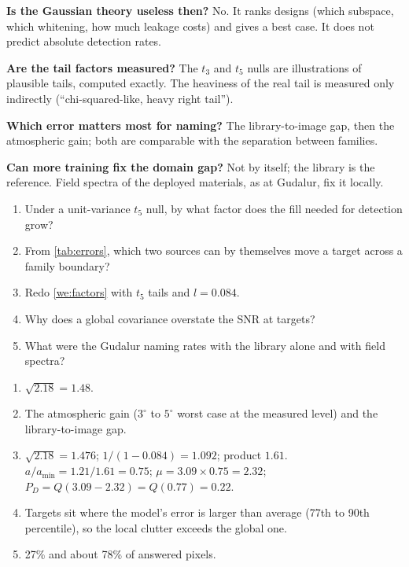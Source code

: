 \documentclass[11pt,a4paper,oneside,openany]{book}
\begin{document}
\begin{confusions}
\textbf{Is the Gaussian theory useless then?} No. It ranks designs (which subspace, which whitening, how much leakage costs) and gives a best case. It does not predict
absolute detection rates.

\textbf{Are the tail factors measured?} The $t_3$ and $t_5$ nulls are illustrations of plausible tails, computed exactly. The heaviness of the real tail is
measured only indirectly (``chi-squared-like, heavy right tail'').

\textbf{Which error matters most for naming?} The library-to-image gap, then the atmospheric gain; both are comparable with the separation between families.

\textbf{Can more training fix the domain gap?} Not by itself; the library is the reference. Field spectra of the deployed materials, as at Gudalur, fix it locally.
\end{confusions}

\begin{checkyourself}
\begin{enumerate}
\item Under a unit-variance $t_5$ null, by what factor does the fill needed for detection grow?
\item From \cref{tab:errors}, which two sources can by themselves move a target across a family boundary?
\item Redo \cref{we:factors} with $t_5$ tails and $l=0.084$.
\item Why does a global covariance overstate the SNR at targets?
\item What were the Gudalur naming rates with the library alone and with field spectra?
\end{enumerate}
\end{checkyourself}

\begin{answers}
\begin{enumerate}
\item $\sqrt{2.18}=1.48$.
\item The atmospheric gain ($3^\circ$ to $5^\circ$ worst case at the measured level) and the library-to-image gap.
\item $\sqrt{2.18}=1.476$; $1/(1-0.084)=1.092$; product $1.61$. $a/a_{\min}=1.21/1.61=0.75$; $\mu=3.09\times0.75=2.32$; $P_D=Q(3.09-2.32)=Q(0.77)=0.22$.
\item Targets sit where the model's error is larger than average (77th to 90th percentile), so the local clutter exceeds the global one.
\item 27\% and about 78\% of answered pixels.
\end{enumerate}
\end{answers}
\end{document}
